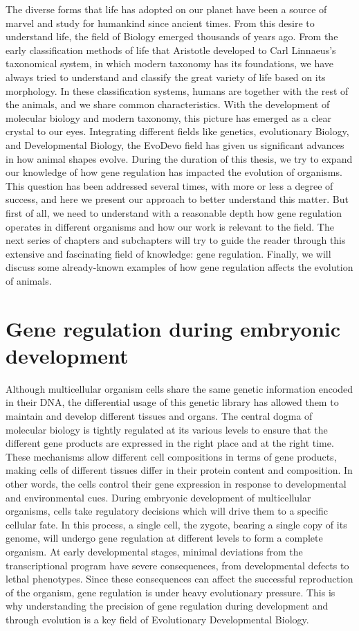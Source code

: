 The diverse forms that life has adopted on our planet have been a source of marvel and study for humankind since ancient times. From this desire to understand life, the field of Biology emerged thousands of years ago. From the early classification methods of life that Aristotle developed to Carl Linnaeus's taxonomical system, in which modern taxonomy has its foundations, we have always tried to understand and classify the great variety of life based on its morphology. In these classification systems, humans are together with the rest of the animals, and we share common characteristics. With the development of molecular biology and modern taxonomy, this picture has emerged as a clear crystal to our eyes. Integrating different fields like genetics, evolutionary Biology, and Developmental Biology, the EvoDevo field has given us significant advances in how animal shapes evolve. 
During the duration of this thesis, we try to expand our knowledge of  how gene regulation has impacted the evolution of organisms. This question has been addressed several times, with more or less a degree of success, and here we present our approach to better understand this matter. But first of all, we need to understand with a reasonable depth how gene regulation operates in different organisms and how our work is relevant to the field. The next series of chapters and subchapters will try to guide the reader through this extensive and fascinating field of knowledge: gene regulation. Finally, we will discuss some already-known examples of how gene regulation affects the evolution of animals.


\chapter{Gene regulation during embryonic development}

Although multicellular organism cells share the same genetic information encoded in their DNA, the differential usage of this genetic library has allowed them to maintain and develop different tissues and organs. The central dogma of molecular biology is tightly regulated at its various levels to ensure that the different gene products are expressed in the right place and at the right time. These mechanisms allow different cell compositions in terms of gene products, making cells of different tissues differ in their protein content and composition. In other words, the cells control their gene expression in response to developmental and environmental cues. During embryonic development of multicellular organisms,  cells take regulatory decisions which will drive them to a specific cellular fate. In this process, a single cell, the zygote, bearing a single copy of its genome, will undergo gene regulation at different levels to form a complete organism. At early developmental stages, minimal deviations from the transcriptional program have severe consequences, from developmental defects to lethal phenotypes. Since these consequences can affect the successful reproduction of the organism, gene regulation is under heavy evolutionary pressure. This is why understanding the precision of gene regulation during development and through evolution is a key field of Evolutionary Developmental Biology.

